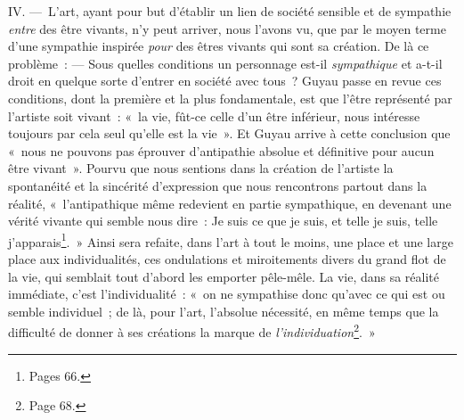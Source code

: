 \documentclass[french,twoside]{book} %
\begin{document}
IV. — L’art, ayant pour but d’établir un lien de société sensible et de sympathie \emph{entre} des être vivants, n’y peut arriver, nous l’avons vu, que par le moyen terme d’une sympathie inspirée \emph{pour} des êtres vivants qui sont sa création. De là ce problème : — Sous quelles conditions un personnage est-il \emph{sympathique} et a-t-il droit en quelque sorte d’entrer en société avec tous ? Guyau passe en revue ces conditions, dont la première et la plus fondamentale, est que l’être représenté par l’artiste soit vivant : « la vie, fût-ce celle d’un être inférieur, nous intéresse toujours par cela seul qu’elle est la vie ». Et Guyau arrive à cette conclusion que « nous ne pouvons pas éprouver d’antipathie absolue et définitive pour aucun être vivant ». Pourvu que nous sentions dans la création de l’artiste la spontanéité et la sincérité d’expression que nous rencontrons partout dans la réalité, « l’antipathique même redevient en partie sympathique, en devenant une vérité vivante qui semble nous dire : Je suis ce que je suis, et telle je suis, telle j’apparais\footnote{Pages 66.}. » Ainsi sera refaite, dans l’art à tout le moins, une place et une large place aux individualités, ces ondulations et miroitements divers du grand flot de la vie, qui semblait tout d’abord les emporter pêle-mêle. La vie, dans sa réalité immédiate, c’est l’individualité : « on ne sympathise donc qu’avec ce qui est ou semble individuel ; de là, pour l’art, l’absolue nécessité, en même temps que la difficulté de donner à ses créations la marque de \emph{l’individuation}\footnote{Page 68.}. »\par
\end{document}
